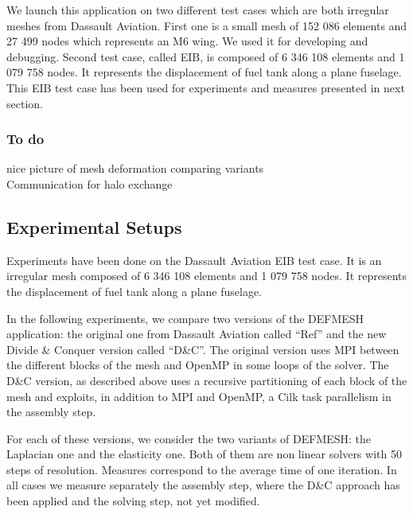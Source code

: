\documentclass{IOS-Book-Article}
\begin{document}
We launch this application on two different test cases which are both irregular meshes from Dassault Aviation.
First one is a small mesh of 152 086 elements and 27 499 nodes which represents an M6 wing. We used it for developing and debugging.
Second test case, called EIB, is composed of 6 346 108 elements and 1 079 758 nodes. It represents the displacement of fuel tank along a plane fuselage.
This EIB test case has been used for experiments and measures presented in next section.

\subsubsection{To do}
nice picture of mesh deformation comparing variants\\
Communication for halo exchange\\

\subsection{Experimental Setups}
Experiments have been done on the Dassault Aviation EIB test case. It is an irregular mesh composed of 6 346 108 elements and 1 079 758 nodes.
It represents the displacement of fuel tank along a plane fuselage.

In the following experiments, we compare two versions of the DEFMESH application: the original one from Dassault Aviation called “Ref” and the new
Divide \& Conquer version called “D\&C”. The original version uses MPI between the different blocks of the mesh and OpenMP in some loops of the solver.
The D\&C version, as described above uses a recursive partitioning of each block of the mesh and exploits, in addition to MPI and OpenMP, a Cilk task parallelism
in the assembly step.

For each of these versions, we consider the two variants of DEFMESH: the Laplacian one and the elasticity one.
Both of them are non linear solvers with 50 steps of resolution. Measures correspond to the average time of one iteration.
In all cases we measure separately the assembly step, where the D\&C approach has been applied and the solving step, not yet modified.
\end{document}
